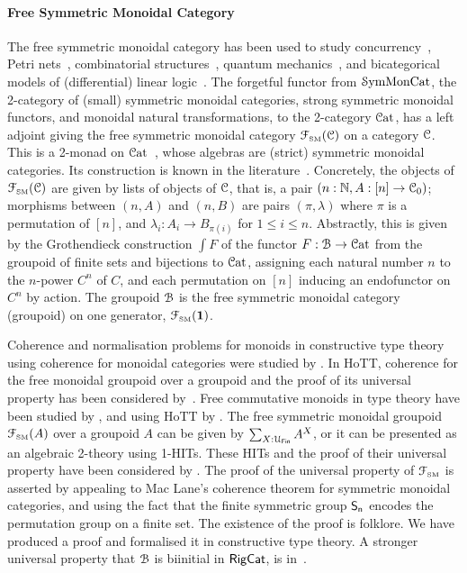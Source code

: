 \paragraph{Free Symmetric Monoidal Category} The free symmetric monoidal category has been used to study
concurrency~\cite{hylandSymmetricMonoidalSketches2004}, Petri nets~\cite{baezCategoriesNets2021}, combinatorial
structures~\cite{fioreCartesianClosedBicategory2008}, quantum mechanics~\cite{abramskyAbstractScalarsLoops2005}, and
bicategorical models of (differential) linear logic~\cite{melliesTemplateGamesDifferential2019}. The forgetful functor
from $\SymMonCat$, the 2-category of (small) symmetric monoidal categories, strong symmetric monoidal functors, and
monoidal natural transformations, to the 2-category $\CatCat$, has a left adjoint giving the free symmetric monoidal
category $\FSM[\CCat{C}]$ on a category $\CCat{C}$. This is a 2-monad on
$\CatCat$~\cite{blackwellTwodimensionalMonadTheory1989}, whose algebras are (strict) symmetric monoidal categories. Its
construction is known in the literature~\cite{abramskyAbstractScalarsLoops2005}.  Concretely, the objects of
$\FSM[\CCat{C}]$ are given by lists of objects of $\CCat{C}$, that is, a pair $(n:\Nat, A:[n] \to \CCat{C}_{0})$;
morphisms between $(n,A)$ and $(n,B)$ are pairs $(\pi,\lambda)$ where $\pi$ is a permutation of $[n]$, and
$\lambda_{i} : A_{i} \to B_{\pi(i)}$ for $1 \leq i \leq n$. Abstractly, this is given by the Grothendieck construction
$\int F$ of the functor $F : \BFin \to \CatCat$ from the groupoid of finite sets and bijections to $\CatCat$, assigning
each natural number $n$ to the $n$-power $C^{n}$ of $C$, and each permutation on $[n]$ inducing an endofunctor on
$C^{n}$ by action. The groupoid $\BFin$ is the free symmetric monoidal category (groupoid) on one generator, $\FSM[\unit]$.

Coherence and normalisation problems for monoids in constructive type theory using coherence for monoidal categories
were studied by \citet{beylinExtractingProofCoherence1996}. In HoTT, coherence for the free monoidal groupoid over a
groupoid and the proof of its universal property has been considered
by~\citet{piceghelloCoherenceMonoidalGroupoids2020}. Free commutative monoids in type theory have been studied by
\citet{gylterudMultisetsTypeTheory2020}, and using HoTT by \citet{choudhuryFinitemultisetConstructionHoTT2019}. The free
symmetric monoidal groupoid $\FSM[A]$ over a groupoid $A$ can be given by $\dsum*{X:\UFin}{A^{X}}$, or it can be
presented as an algebraic 2-theory using 1-HITs. These HITs and the proof of their universal property have been
considered by \citet{piceghelloCoherenceSymmetricMonoidal2019,choudhuryFinitemultisetConstructionHoTT2019}. The proof of
the universal property of $\FSM$ is asserted by appealing to Mac Lane's coherence theorem for symmetric monoidal
categories, and using the fact that the finite symmetric group $\Sn$ encodes the permutation group on a finite set. The
existence of the proof is folklore. We have produced a proof and formalised it in constructive type theory. A stronger
universal property that $\BFin$ is biinitial in $\operatorname{\mathsf{RigCat}}$, is in~\cite{elguetaGroupoidFiniteSets2021}.

